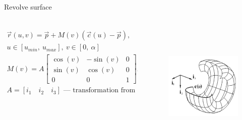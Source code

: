 \documentclass[aspectratio=169]{beamer}
\begin{document}
\begin{frame}[t]{Revolve surface}
    \framesubtitle{}
        \begin{columns}[T,onlytextwidth]
            \begin{column}{0.69\textwidth}
                \begin{align*}
                    \vec{r}(u,v) = \vec{p} + M(v)(\vec{c}(u) - \vec{p}), \\ u \in [u_{min},\ u_{max}],\ v \in [0,\ \alpha] \\ 
                    M(v) = A \begin{bmatrix}
                    \cos(v) & -\sin(v) & 0 \\
                    \sin(v) & \cos(v) & 0 \\ 
                    0 & 0  & 1 
                    \end{bmatrix} A^{-1}, \text{ --- rotation matrix}\\ 
                    A = [i_1 \quad i_2 \quad i_3] \text{ --- transformation from local to global CS}
                \end{align*}
            \end{column}
            \begin{column}{0.29\textwidth}
                \vspace{-0.5cm}
                \begin{figure}[H]
                    \centering\includegraphics[height=6cm,width=1\textwidth,keepaspectratio]{revolve_surface_book.png}
                    \label{fig:revolve_surface_book.png}
                \end{figure}
            \end{column}
        \end{columns}
    \end{frame}
\end{document}
